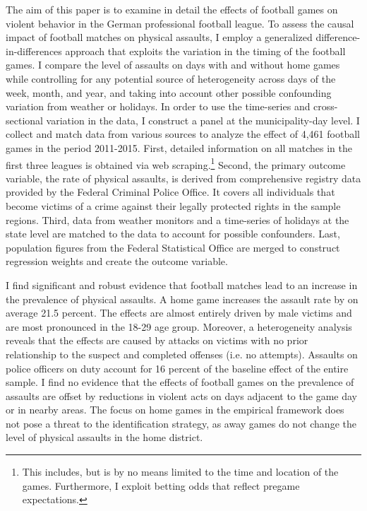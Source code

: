 The aim of this paper is to examine in detail the effects of football games on violent behavior in the German professional football league. To assess the causal impact of football matches on physical assaults, I employ a generalized difference-in-differences approach that exploits the variation in the timing of the football games. I compare the level of assaults on days with and without home games while controlling for any potential source of heterogeneity across days of the week, month, and year, and taking into account other possible confounding variation from weather or holidays. In order to use the time-series and cross-sectional variation in the data, I construct a panel at the municipality-day level. I collect and match data from various sources to analyze the effect of 4,461 football games in the period 2011-2015. First, detailed information on all matches in the first three leagues is obtained via web scraping.\footnote{This includes, but is by no means limited to the time and location of the games. Furthermore, I exploit betting odds that reflect pregame expectations.} Second, the primary outcome variable, the rate of physical assaults, is derived from comprehensive registry data provided by the Federal Criminal Police Office. It covers all individuals that become victims of a crime against their legally protected rights in the sample regions. Third, data from weather monitors and a time-series of holidays at the state level are matched to the data to account for possible confounders. Last, population figures from the Federal Statistical Office are merged to construct regression weights and create the outcome variable. 



I find significant and robust evidence that football matches lead to an increase in the prevalence of physical assaults. A home game increases the assault rate by on average 21.5 percent. The effects are almost entirely driven by male victims and are most pronounced in the 18-29 age group. Moreover, a heterogeneity analysis reveals that the effects are caused by attacks on victims with no prior relationship to the suspect and completed offenses (i.e. no attempts). Assaults on police officers on duty account for 16 percent of the baseline effect of the entire sample. I find no evidence that the effects of football games on the prevalence of assaults are offset by reductions in violent acts on days adjacent to the game day or in nearby areas. The focus on home games in the empirical framework does not pose a threat to the identification strategy, as away games do not change the level of physical assaults in the home district.



